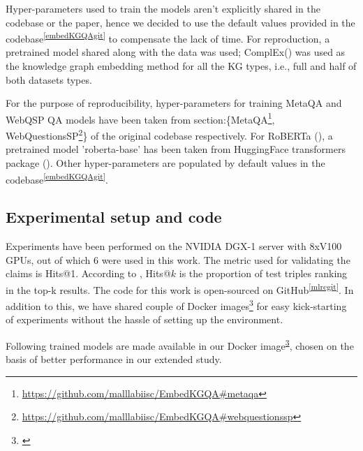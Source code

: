 Hyper-parameters used to train the models aren't explicitly shared in the codebase or the paper, hence we decided to use the default values provided in the codebase\textsuperscript{\ref{embedKGQAgit}} to compensate the lack of time. For reproduction, a pretrained model shared along with the data was used; ComplEx(\citep{ComplEx2016}) was used as the knowledge graph embedding method for all the KG types, i.e., full and half of both datasets types. 

For the purpose of reproducibility,  hyper-parameters for training MetaQA and WebQSP QA models have been taken from section:\{MetaQA\footnote{\url{https://github.com/malllabiisc/EmbedKGQA\#metaqa}}, WebQuestionsSP\footnote{\url{https://github.com/malllabiisc/EmbedKGQA\#webquestionssp}}\} of the original codebase respectively. For RoBERTa (\citep{roberta}), a pretrained model 'roberta-base' has been taken from HuggingFace transformers package (\citep{huggingface-transformers-package-2020}). Other hyper-parameters are populated by default values in the codebase\textsuperscript{\ref{embedKGQAgit}}.





\subsection{Experimental setup and code}
Experiments have been performed on the NVIDIA DGX-1 server with 8xV100 GPUs, out of which 6 were used in this work. The metric used for validating the claims is Hits@1. According to \citep{kg-embedding-evaluation}, Hits@$k$ is the proportion of test triples ranking in the top-k results. The code for this work is open-sourced on GitHub\textsuperscript{\ref{mlrcgit}}. In addition to this, we have shared couple of Docker images\footnote{\label{mlrcdocker}\mlrcdocker} for easy kick-starting of experiments without the hassle of setting up the environment.

Following trained models are made available in our Docker image\textsuperscript{\ref{mlrcdocker}}, chosen on the basis of better performance in our extended study.

